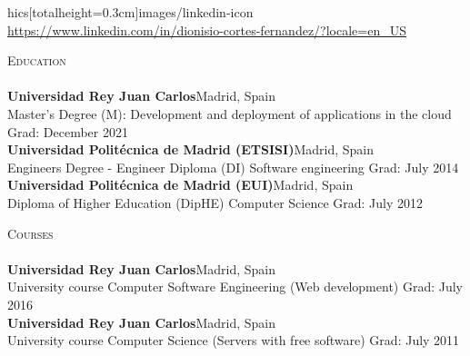 \documentclass[a4paper]{article}
\newcommand{\lineunder} {
    \vspace*{-8pt} \\
    \hspace*{-18pt} \hrulefill \\
}
\newcommand{\header} [1] {
    {\hspace*{-18pt}\vspace*{6pt} \textsc{#1}}
    \vspace*{-6pt} \lineunder
}
\begin{document}
\begin{center}
hics[totalheight=0.3cm]{images/linkedin-icon} \url{https://www.linkedin.com/in/dionisio-cortes-fernandez/?locale=en\_US}\\
\end{center}

\vspace*{2mm}

\header{Education}
\textbf{Universidad Rey Juan Carlos}\hfill Madrid, Spain\\
Master’s Degree (M): Development and deployment of applications in the cloud \hfill Grad: December 2021\\
\vspace{2mm}
\textbf{Universidad Polit\'ecnica de Madrid (ETSISI)}\hfill Madrid, Spain\\
Engineer\textquotesingle s Degree  - Engineer Diploma (DI) Software engineering \hfill Grad: July 2014\\
\vspace{2mm}
\textbf{Universidad Polit\'ecnica de Madrid (EUI)}\hfill Madrid, Spain\\
Diploma of Higher Education (DipHE) Computer Science \hfill Grad: July 2012\\
\vspace{2mm}
\vspace{2mm}

\header{Courses}
\textbf{Universidad Rey Juan Carlos}\hfill Madrid, Spain\\
University course Computer Software Engineering (Web development) \hfill Grad: July 2016\\
\vspace{2mm}
\textbf{Universidad Rey Juan Carlos}\hfill Madrid, Spain\\
University course Computer Science (Servers with free software) \hfill Grad: July 2011\\
\vspace*{2mm}
\end{document}
